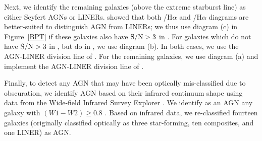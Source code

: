 Next, we identify the remaining galaxies (above the extreme starburst line) as either Seyfert AGNs or LINERs. \citet{Kewley2006} showed that both /H$\alpha$ and  /H$\alpha$ diagrams are better-suited to distinguish AGN from LINERs; we thus use diagram (c) in Figure~\ref{BPT} if these galaxies also have $\rm S/N>3$ in . For galaxies which do not have $\rm S/N>3$ in , but do in , we use diagram (b). In both cases, we use the AGN-LINER division line of \citet{Kewley2006}. For the remaining galaxies, we use diagram (a) and implement the AGN-LINER division line of \citet{Schawinski2007}.

Finally, to detect any AGN that may have been optically mis-classified due to obscuration, we identify AGN based on their infrared continuum shape using data from the Wide-field Infrared Survey Explorer \citep[WISE]{Wright2010}. We identify as an AGN any galaxy with $(W1-W2) \ge 0.8$ \citep{Stern2012}. Based on infrared data, we re-classified fourteen galaxies (originally classified optically as three star-forming, ten composites, and one LINER) as AGN. 

